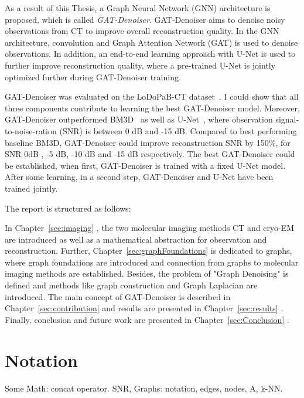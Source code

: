 \clearpage

As a result of this Thesis, a Graph Neural Network (GNN) architecture is proposed, which is called \textit{GAT-Denoiser}.
GAT-Denoiser aims to denoise noisy observations from CT to improve overall reconstruction quality.
In the GNN architecture, convolution and Graph Attention Network (GAT) is used to denoise observations.
In addition, an end-to-end learning approach with U-Net is used to further improve reconstruction quality, 
where a pre-trained U-Net is jointly optimized further during GAT-Denoiser training.

GAT-Denoiser was evaluated on the LoDoPaB-CT dataset~\cite{lodopab-dataset}.
I could show that all three components contribute to learning the best GAT-Denoiser model.
Moreover, GAT-Denoiser outperformed BM3D~\cite{bm3d} as well as U-Net~\cite{unet-tomography},
where observation signal-to-noise-ration (SNR) is between 0 dB and -15 dB.
Compared to best performing baseline BM3D, GAT-Denoiser could improve reconstruction SNR 
by 150\%, for SNR 0dB , -5 dB, -10 dB and -15 dB respectively.
The best GAT-Denoiser could be established, when first, GAT-Denoiser is trained with a fixed U-Net model.
After some learning, in a second step, GAT-Denoiser and U-Net have been trained jointly.


\bigskip

The report is structured as follows: 


In Chapter~\ref{sec:imaging} \textit{}, the two molecular imaging methods
CT and cryo-EM are introduced as well as a mathematical abstraction for observation and reconstruction.
Further, Chapter~\ref{sec:graphFoundations} \textit{} is dedicated to graphs, 
where graph foundations are introduced and connection from graphs to molecular imaging methods are established. 
Besides, the problem of "Graph Denoising" is defined and methods like graph construction and Graph Laplacian are introduced.
The main concept of GAT-Denoiser is described in Chapter~\ref{sec:contribution} \textit{}
and results are presented in Chapter~\ref{sec:results} \textit{}.
Finally, conclusion and future work are presented in Chapter~\ref{sec:Conclusion} \textit{}.

\chapter{Notation}

Some Math: concat operator.
SNR, \snry
Graphs: notation, edges, nodes, A, k-NN.